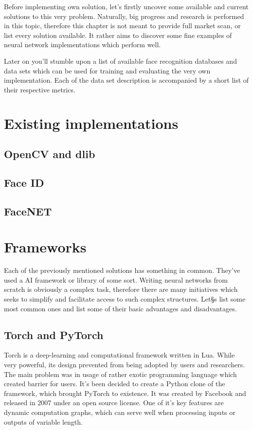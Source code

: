 Before implementing own solution, let's firstly uncover some available and current solutions to this very problem. Naturally, big progress and research is performed in this topic, therefore this chapter is not meant to provide full market scan, or list every solution available. It rather aims to discover some fine examples of neural network implementations which perform well.

Later on you'll stumble upon a list of available face recognition databases and data sets which can be used for training and evaluating the very own implementation. Each of the data set description is accompanied by a short list of their respective metrics.

\section{Existing implementations}

\subsection{OpenCV and dlib}

\subsection{Face ID}

\subsection{FaceNET}


\section{Frameworks}

Each of the previously mentioned solutions has something in common. They've used a AI framework or library of some sort. Writing neural networks from scratch is obviously a complex task, therefore there are many initiatives which seeks to simplify and facilitate access to such complex structures. Let§s list some most common ones and list some of their basic advantages and disadvantages.

\subsection{Torch and PyTorch}

Torch is a deep-learning and computational framework written in Lua. While very powerful, its design prevented from being adopted by users and researchers. The main problem was in usage of rather exotic programming language which created barrier for users. It's been decided to create a Python clone of the framework, which brought PyTorch to existence. It was created by Facebook and released in 2007 under an open source license. One of it's key features are dynamic computation graphs, which can serve well when processing inputs or outputs of variable length.

